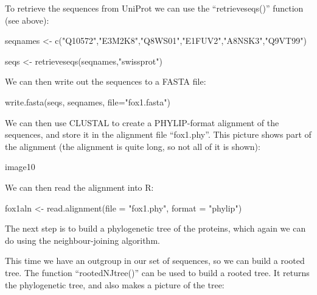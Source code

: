 \documentclass[
]{book}
\newenvironment{Shaded}{\begin{snugshade}}{\end{snugshade}}
\newcommand{\AttributeTok}[1]{\textcolor[rgb]{0.77,0.63,0.00}{#1}}
\newcommand{\FunctionTok}[1]{\textcolor[rgb]{0.00,0.00,0.00}{#1}}
\newcommand{\NormalTok}[1]{#1}
\newcommand{\OtherTok}[1]{\textcolor[rgb]{0.56,0.35,0.01}{#1}}
\newcommand{\StringTok}[1]{\textcolor[rgb]{0.31,0.60,0.02}{#1}}
\begin{document}
To retrieve the sequences from UniProt we can use the ``retrieveseqs()'' function (see above):

\begin{Shaded}
\begin{Highlighting}[]
\NormalTok{seqnames }\OtherTok{\textless{}{-}} \FunctionTok{c}\NormalTok{(}\StringTok{"Q10572"}\NormalTok{,}\StringTok{"E3M2K8"}\NormalTok{,}\StringTok{"Q8WS01"}\NormalTok{,}\StringTok{"E1FUV2"}\NormalTok{,}\StringTok{"A8NSK3"}\NormalTok{,}\StringTok{"Q9VT99"}\NormalTok{)}
\end{Highlighting}
\end{Shaded}

\begin{Shaded}
\begin{Highlighting}[]
\NormalTok{seqs }\OtherTok{\textless{}{-}} \FunctionTok{retrieveseqs}\NormalTok{(seqnames,}\StringTok{"swissprot"}\NormalTok{)}
\end{Highlighting}
\end{Shaded}

We can then write out the sequences to a FASTA file:

\begin{Shaded}
\begin{Highlighting}[]
\FunctionTok{write.fasta}\NormalTok{(seqs, seqnames, }\AttributeTok{file=}\StringTok{"fox1.fasta"}\NormalTok{)}
\end{Highlighting}
\end{Shaded}

We can then use CLUSTAL to create a PHYLIP-format alignment of the sequences, and store it in the alignment file ``fox1.phy''. This picture shows part of the alignment (the alignment is quite long, so not all of it is shown):

image10

We can then read the alignment into R:

\begin{Shaded}
\begin{Highlighting}[]
\NormalTok{fox1aln  }\OtherTok{\textless{}{-}} \FunctionTok{read.alignment}\NormalTok{(}\AttributeTok{file =} \StringTok{"fox1.phy"}\NormalTok{, }\AttributeTok{format =} \StringTok{"phylip"}\NormalTok{)}
\end{Highlighting}
\end{Shaded}

The next step is to build a phylogenetic tree of the proteins, which again we can do using the neighbour-joining algorithm.

This time we have an outgroup in our set of sequences, so we can build a rooted tree. The function ``rootedNJtree()'' can be used to build a rooted tree. It returns the phylogenetic tree, and also makes a picture of the tree:
\end{document}
